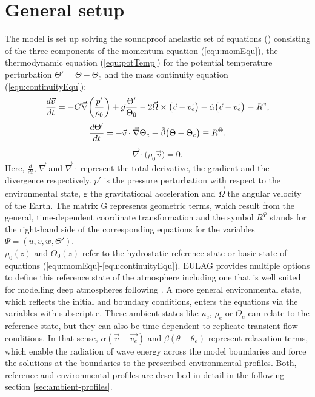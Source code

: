 \section{General setup}
\label{sec:eulag-setup}
The model is set up solving the soundproof anelastic set of equations (\cite{lipps_scale_1982}) consisting of the three components of the momentum equation (\ref{equ:momEqu}), the thermodynamic equation (\ref{equ:potTemp}) for the potential temperature perturbation $\Theta'=\Theta-\Theta_e$ and the mass continuity equation (\ref{equ:continuityEqu}):
%
\begin{equation}
\begin{aligned}
    \frac{d \Vec{v}}{dt} = -G \Vec{\nabla} \biggl(\frac{p'}{\rho_0}\biggr) +  \Vec{g} \frac{\Theta'}{\Theta_0} - 2 \Vec{\Omega} \times \bigl(\Vec{v}-\Vec{v_e}\bigr) - \Tilde{\alpha} \bigl(\Vec{v}-\Vec{v_e}\bigr) \equiv R^{v},
    \label{equ:momEqu}
\end{aligned}
\end{equation}
\begin{equation}
    \frac{d \Theta'}{dt} = -\Vec{v} \cdot \Vec{\nabla} \Theta_e - \Tilde{\beta} \bigl(\Theta-\Theta_e\bigr) \equiv R^{\Theta},
    \label{equ:potTemp}
\end{equation}
\begin{equation}
    \Vec{\nabla} \cdot \bigl(\rho_0 \Vec{v}\bigr) = 0.
    \label{equ:continuityEqu}
\end{equation}
%
Here, $\frac{d}{dt}$, $\Vec{\nabla}$ and $\Vec{\nabla} \cdot$ represent the total derivative, the gradient and the divergence respectively. $p'$ is the pressure perturbation with respect to the environmental state, g the gravitational acceleration and $\Vec{\Omega}$ the angular velocity of the Earth. The matrix G represents geometric terms, which result from the general, time-dependent coordinate transformation and the symbol $R^{\Psi}$ stands for the right-hand side of the corresponding equations for the variables $\Psi = (u,v,w,\Theta')$. \\
$\rho_0(z)$ and $\Theta_0(z)$ refer to the hydrostatic reference state or basic state of equations (\ref{equ:momEqu}-\ref{equ:continuityEqu}). EULAG provides multiple options to define this reference state of the atmosphere including one that is well suited for modelling deep atmospheres following \textcite{bacmeister_breakdown_1989}. A more general environmental state, which reflects the initial and boundary conditions, enters the equations via the variables with subscript e. These ambient states like $u_e$, $\rho_e$ or $\Theta_e$ can relate to the reference state, but they can also be time-dependent to replicate transient flow conditions. In that sense, $\alpha(\Vec{v}-\Vec{v_e})$ and $\beta(\theta-\theta_e)$ represent relaxation terms, which enable the radiation of wave energy across the model boundaries and force the solutions at the boundaries to the prescribed environmental profiles. Both, reference and environmental profiles are described in detail in the following section \ref{sec:ambient-profiles}. \\
